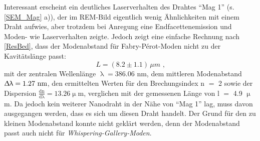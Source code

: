Interessant erscheint ein deutliches Laserverhalten des Drahtes ``Mag 1'' (s. \autoref{SEM_Mag} a)), der im REM-Bild eigentlich wenig Ähnlichkeiten mit einem Draht aufwies, aber trotzdem bei Anregung eine Endfacettenemission und Moden- wie Laserverhalten zeigte. Jedoch zeigt eine einfache Rechnung nach \autoref{ResBed}, dass der Modenabstand für Fabry-Pérot-Moden nicht zu der Kavitätslänge passt:
\begin{equation}
L=(8.2 \pm 1.1)\, \mu m \text{ ,}
\end{equation}
mit der zentralen Wellenlänge $\uplambda = \text{386.06 nm}$, dem mittleren Modenabstand $\Updelta \uplambda = \text{1.27 nm}$, den ermittelten Werten für den Brechungsindex n $=$ 2 sowie der Dispersion $\frac{\text{dn}}{\text{d}\uplambda} = \text{13.26} \upmu\text{m}$, verglichen mit der gemessenen Länge von l $=$ 4.9 $\upmu$m. Da jedoch kein weiterer Nanodraht in der Nähe von ``Mag 1'' lag, muss davon ausgegangen werden, dass es sich um diesen Draht handelt. Der Grund für den zu kleinen Modenabstand konnte nicht geklärt werden, denn der Modenabstand passt auch nicht für \textit{Whispering-Gallery-Moden}. 
